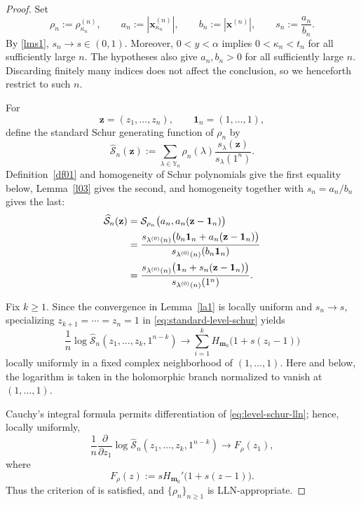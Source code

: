 \documentclass[11pt]{amsart}
\theoremstyle{plain}
\newcommand\YY{{\mathbb {Y}}}
\numberwithin{equation}{section}
\numberwithin{theorem}{section}
\numberwithin{figure}{section}
\begin{document}
\begin{proof}
Set
\[
    \rho_n:=\rho_{\kappa_n}^{(n)},
    \qquad
    a_n:=|\mathbf x_{\kappa_n}^{(n)}|,
    \qquad
    b_n:=|\mathbf x^{(n)}|,
    \qquad
    s_n:=\frac{a_n}{b_n}.
\]
By \eqref{lms1}, \(s_n\to s\in(0,1)\). Moreover,
\(0<y<\alpha\) implies \(0<\kappa_n<t_n\) for all sufficiently large
\(n\). The hypotheses also give \(a_n,b_n>0\) for all sufficiently
large \(n\). Discarding finitely many indices does not affect the
conclusion, so we henceforth restrict to such \(n\).

For
\[
    \mathbf z=(z_1,\ldots,z_n),
    \qquad
    \mathbf 1_n=(1,\ldots,1),
\]
define the standard Schur generating function of \(\rho_n\) by
\[
    \widehat{\mathcal S}_n(\mathbf z)
    :=
    \sum_{\lambda\in\YY_n}
    \rho_n(\lambda)
    \frac{s_\lambda(\mathbf z)}{s_\lambda(1^n)}.
\]
Definition~\ref{df01} and homogeneity of Schur polynomials give the
first equality below, Lemma~\ref{l03} gives the second, and homogeneity
together with \(s_n=a_n/b_n\) gives the last:
\begin{align}
    \widehat{\mathcal S}_n(\mathbf z)
    &=
    \mathcal S_{\rho_n}
    \bigl(a_n,a_n(\mathbf z-\mathbf 1_n)\bigr)
    \notag\\
    &=
    \frac{
        s_{\lambda^{(0)}(n)}
        \bigl(b_n\mathbf 1_n+a_n(\mathbf z-\mathbf 1_n)\bigr)
    }{
        s_{\lambda^{(0)}(n)}(b_n\mathbf 1_n)
    }
    \notag\\
    &=
    \frac{
        s_{\lambda^{(0)}(n)}
        \bigl(\mathbf 1_n+s_n(\mathbf z-\mathbf 1_n)\bigr)
    }{
        s_{\lambda^{(0)}(n)}(1^n)
    }.
    \label{eq:standard-level-schur}
\end{align}

Fix \(k\geq1\). Since the convergence in Lemma~\ref{la1} is locally
uniform and \(s_n\to s\), specializing
\(z_{k+1}=\cdots=z_n=1\) in
\eqref{eq:standard-level-schur} yields
\begin{equation}
    \frac1n
    \log
    \widehat{\mathcal S}_n
    (z_1,\ldots,z_k,1^{n-k})
    \longrightarrow
    \sum_{i=1}^k
    H_{\mathbf m_0}\bigl(1+s(z_i-1)\bigr)
    \label{eq:level-schur-lln}
\end{equation}
locally uniformly in a fixed complex neighborhood of
\((1,\ldots,1)\). Here and below, the logarithm is taken in the
holomorphic branch normalized to vanish at \((1,\ldots,1)\).

Cauchy's integral formula permits differentiation of
\eqref{eq:level-schur-lln}; hence, locally uniformly,
\[
    \frac1n
    \frac{\partial}{\partial z_1}
    \log
    \widehat{\mathcal S}_n
    (z_1,\ldots,z_k,1^{n-k})
    \longrightarrow
    F_\rho(z_1),
\]
where
\[
    F_\rho(z)
    :=
    sH_{\mathbf m_0}'\bigl(1+s(z-1)\bigr).
\]
Thus the criterion of
\cite[General Example~2.3]{bg16} is satisfied, and
\(\{\rho_n\}_{n\geq1}\) is LLN-appropriate.


\end{proof}
\end{document}
